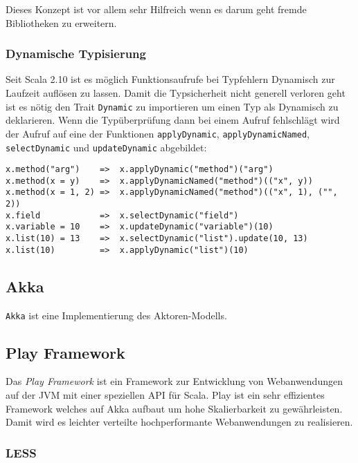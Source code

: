 Dieses Konzept ist vor allem sehr Hilfreich wenn es darum geht fremde  Bibliotheken zu erweitern.

\subsubsection{Dynamische Typisierung}

Seit Scala 2.10 ist es möglich Funktionsaufrufe bei Typfehlern Dynamisch zur  Laufzeit auflösen zu
lassen. Damit die Typsicherheit nicht generell verloren  geht ist es nötig den Trait
\texttt{Dynamic} zu importieren um einen Typ als  Dynamisch zu deklarieren. Wenn die Typüberprüfung
dann bei einem Aufruf  fehlschlägt wird der Aufruf auf eine der Funktionen \texttt{applyDynamic},
\texttt{applyDynamicNamed}, \texttt{selectDynamic} und \texttt{updateDynamic}  abgebildet:

\begin{lstlisting}
x.method("arg")    =>  x.applyDynamic("method")("arg")
x.method(x = y)    =>  x.applyDynamicNamed("method")(("x", y))
x.method(x = 1, 2) =>  x.applyDynamicNamed("method")(("x", 1), ("", 2))
x.field            =>  x.selectDynamic("field")
x.variable = 10    =>  x.updateDynamic("variable")(10)
x.list(10) = 13    =>  x.selectDynamic("list").update(10, 13)
x.list(10)         =>  x.applyDynamic("list")(10)
\end{lstlisting}
 
\subsection{Akka}

\cite{actors}

\texttt{Akka} ist eine Implementierung des Aktoren-Modells.

\subsection{Play Framework}

Das \textit{Play Framework} ist ein Framework zur Entwicklung von Webanwendungen  auf der JVM mit
einer speziellen API für Scala. Play ist ein sehr effizientes  Framework welches auf Akka aufbaut um
hohe Skalierbarkeit zu gewährleisten.  Damit wird es leichter verteilte hochperformante
Webanwendungen zu realisieren.

\subsubsection{LESS}

